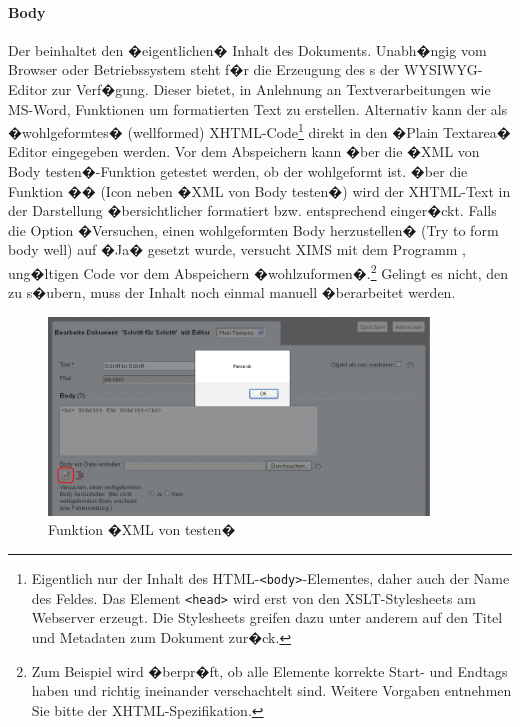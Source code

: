 \paragraph{Body}
\label{body}

Der  beinhaltet den �eigentlichen� Inhalt des
Dokuments. Unabh�ngig vom Browser oder Betriebssystem steht f�r die
Erzeugung des s der WYSIWYG-Editor
 zur Verf�gung. Dieser bietet, in Anlehnung an
Textverarbeitungen wie MS-Word, Funktionen um formatierten Text zu
erstellen. Alternativ kann der  als �wohlgeformtes�
(wellformed) XHTML-Code\footnote{Eigentlich nur der Inhalt des
  HTML-\texttt{<body>}-Elementes, daher auch der Name des Feldes. Das
  Element \texttt{<head>} wird erst von den XSLT-Stylesheets am
  Webserver erzeugt. Die Stylesheets greifen dazu unter anderem auf
  den Titel und Metadaten zum Dokument zur�ck.} direkt in den �Plain
Textarea� Editor eingegeben werden. Vor dem Abspeichern kann �ber die
�XML von Body testen�-Funktion getestet werden, ob der 
wohlgeformt ist. �ber die Funktion �� (Icon
neben �XML von Body testen�) wird der XHTML-Text in der Darstellung
�bersichtlicher formatiert bzw. entsprechend einger�ckt. Falls die
Option �Versuchen, einen wohlgeformten Body herzustellen� (Try to form
body well) auf �Ja� gesetzt wurde, versucht XIMS mit dem Programm
, ung�ltigen Code vor dem Abspeichern
�wohlzuformen�.\footnote{Zum Beispiel wird �berpr�ft, ob alle Elemente
  korrekte Start- und Endtags haben und richtig ineinander
  verschachtelt sind. Weitere Vorgaben entnehmen Sie bitte der
  XHTML-Spezifikation.} Gelingt es  nicht, den
 zu s�ubern, muss der Inhalt noch einmal manuell
�berarbeitet werden.

\begin{figure}[!ht]
  \centering
  \includegraphics[width=0.9\textwidth]{./images/xmlvonbodytesten.png}
  \caption{Funktion �XML von  testen�}
  \label{fig:xmlvonbodytesten}
\end{figure}

